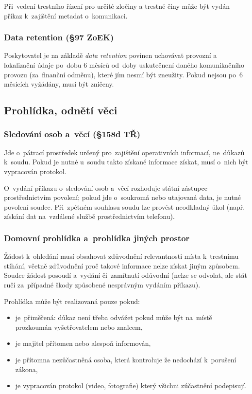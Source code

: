 Při~vedení trestního řízení pro určité zločiny a trestné činy může být vydán příkaz k~zajištění metadat o~komunikaci.

\subsubsection{Data retention (§97 ZoEK)}

Poskytovatel je na základě \emph{data retention} povinen uchovávat provozní a lokalizační údaje po~dobu 6 měsíců od~doby uskutečnení daného komunikačního provozu (za~finanční odměnu), které jím nesmí být zneužity.
Pokud nejsou po~6 měsících vyžádány, musí být zničeny.


\subsection{Prohlídka, odnětí věci}

\subsubsection{Sledování osob a~věcí (§158d TŘ)}

Jde o~pátrací prostředek určený pro~zajištění operativních informací, ne~důkazů k~soudu.
Pokud je nutné u~soudu takto získané informace získat, musí o~nich být vypracován protokol.

O~vydání příkazu o~sledování osob a~věcí rozhoduje státní zástupce prostřednictvím povolení; pokud jde o~soukromá nebo utajovaná data, je nutné povolení soudce.
Při~zpětném souhlasu soudu lze provést neodkladný úkol (např. získání dat na~vzdálené službě prostřednictvím telefonu).

\subsubsection{Domovní prohlídka a~prohlídka jiných prostor}

Žádost k~ohledání musí obsahovat zdůvodnění relevantnosti místa k~trestnímu stíhání, včetně zdůvodnění proč takové informace nelze získat jiným způsobem.
Soudce žádost posoudí a~vydání či~zamítnutí odůvodní (nelze se odvolat, ale stát ručí za~případné škody způsobené nesprávným vydáním příkazu).

Prohlídka může být realizovaná pouze pokud:
\vspace*{-1em}\begin{itemize}
\item je~přiměřená: důkaz není třeba odvážet pokud může být na~místě prozkoumán vyšetřovatelem nebo znalcem,
\item je majitel přítomen nebo alespoň informován,
\item je přítomna nezůčastněná osoba, která kontroluje že nedochází k~porušení zákona,
\item je vypracován protokol (video, fotografie) který všichni zúčastnění podepisují.
\end{itemize}

